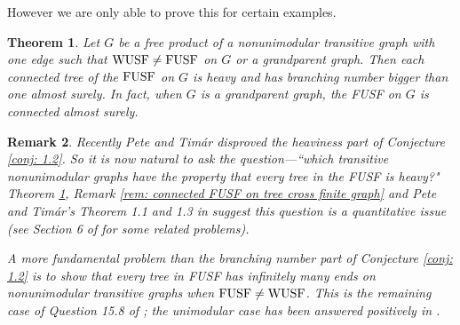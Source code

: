 \documentclass[12pt]{article}
\newtheorem{theorem}{Theorem}[section]
\newtheorem{remark}[theorem]{Remark}
\numberwithin{equation}{section}
\newcommand{\1}{\mathbf{1}}
\begin{document}
However we are only able to prove this for certain examples.  

 \begin{theorem}\label{thm:heavy for FUSF}
 	Let $G$ be a free product of a nonunimodular transitive graph with one edge such that $\textnormal{WUSF}\neq\textnormal{FUSF}$ on $G$ or a grandparent graph. Then each connected tree of the $\textnormal{FUSF}$ on $G$ is heavy and has branching number bigger than one almost surely. In fact, when $G$ is a grandparent graph, the FUSF on $G$ is connected almost surely.
 \end{theorem}
\begin{remark}
	Recently Pete and Tim\'{a}r \cite{PeteTimar2020} disproved the heaviness part of   Conjecture \ref{conj: 1.2}. So it is now natural to ask the question---``which transitive nonunimodular graphs have the property that every tree in the FUSF is heavy?" Theorem \ref{thm:heavy for FUSF},  Remark \ref{rem: connected FUSF on tree cross finite graph} and Pete and Tim\'{a}r's  Theorem 1.1 and 1.3 in \cite{PeteTimar2020}  suggest this question is a quantitative issue (see Section 6 of \cite{PeteTimar2020} for some related problems). 
%	

A more fundamental problem than the branching number part of Conjecture \ref{conj: 1.2} is to show that every tree in FUSF has infinitely many ends on nonunimodular transitive graphs  when $\textnormal{FUSF}\neq\textnormal{WUSF}$. This is the remaining case of Question 15.8 of \cite{BLPS2001}; the unimodular case has been answered positively in \cite{TomAsaf2017,Timar2018indis}. 
\end{remark}


 
 
\end{document}
